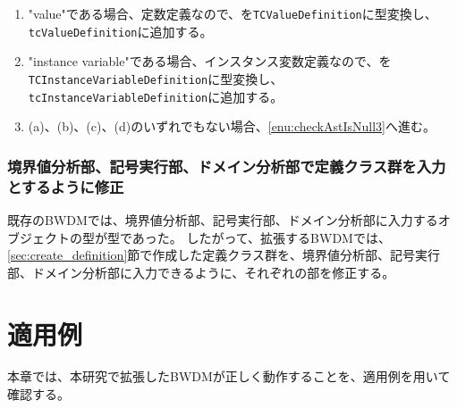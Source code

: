 \documentclass[uplatex, report, a4j, 10pt]{jsbook}
\newcommand\ttt[1]{\texttt{#1}}
\begin{document}
\begin{enumerate}
\begin{enumerate}
\begin{enumerate}
                \end{enumerate}
          \item "value"である場合、定数定義なので、\astDefinition{}を\ttt{TCValueDefinition}に型変換し、\ttt{tcValueDefinition}に追加する。
          \item "instance variable"である場合、インスタンス変数定義なので、\astDefinition{}を\ttt{TCInstanceVariableDefinition}に型変換し、\ttt{tcInstanceVariableDefinition}に追加する。
          \item (a)、(b)、(c)、(d)のいずれでもない場合、\ref{enu:checkAstIsNull3}へ進む。
        \end{enumerate}
\end{enumerate}

\subsection{境界値分析部、記号実行部、ドメイン分析部で定義クラス群を入力とするように修正}
既存のBWDMでは、境界値分析部、記号実行部、ドメイン分析部に入力するオブジェクトの型が\TCExplicitFunctionDefinition{}型であった。
したがって、拡張するBWDMでは、\ref{sec:create_definition}節で作成した定義クラス群を、境界値分析部、記号実行部、ドメイン分析部に入力できるように、それぞれの部を修正する。

\chapter{適用例}\label{cha:Indication}
本章では、本研究で拡張したBWDMが正しく動作することを、適用例を用いて確認する。
\end{document}
